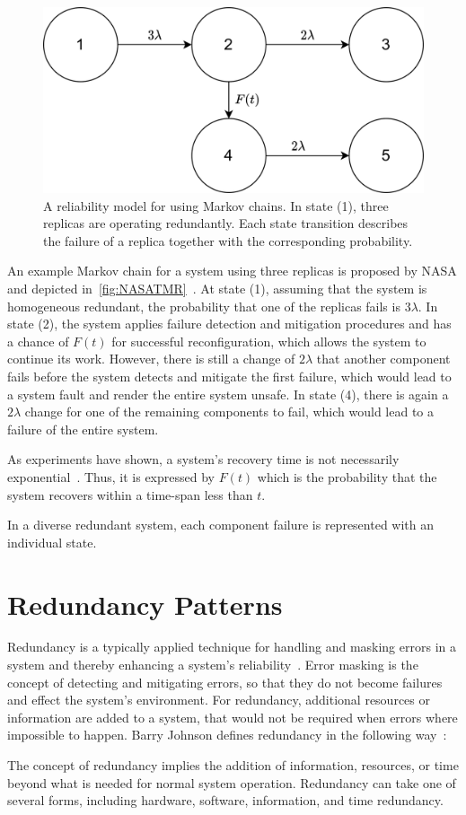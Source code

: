 \begin{figure}[!hb]
	\centering
	\includegraphics[width=0.75\linewidth]{images/TriplexSystemNASA}
	\caption{A reliability model for  using Markov chains. In state (1), three replicas are operating redundantly. Each state transition describes the failure of a replica together with the corresponding probability.}
	\label{fig:NASATMR}
\end{figure}

An example Markov chain for a system using three replicas is proposed by NASA and depicted in~\autoref{fig:NASATMR}~\cite{NASAMarkovChains}.
At state (1), assuming that the system is homogeneous redundant, the probability that one of the replicas fails is $3\lambda$.
In state (2), the system applies failure detection and mitigation procedures and has a chance of $F(t)$ for successful reconfiguration, which allows the system to continue its work.
However, there is still a change of $2\lambda$ that another component fails before the system detects and mitigate the first failure, which would lead to a system fault and render the entire system unsafe.
In state (4), there is again a $2\lambda$ change for one of the remaining components to fail, which would lead to a failure of the entire system.

As experiments have shown, a system's recovery time is not necessarily exponential~\cite{TheoryAndPracticeReliableSystem}.
Thus, it is expressed by $F(t)$ which is the probability that the system recovers within a time-span less than $t$.

In a diverse redundant system, each component failure is represented with an individual state.

\section{Redundancy Patterns}
\label{sec:redundancyPatterns}
Redundancy is a typically applied technique for handling and masking errors in a system and thereby enhancing a system's reliability~\cite{TanenbaumSteen07}.
Error masking is the concept of detecting and mitigating errors, so that they do not become failures and effect the system's environment.
For redundancy, additional resources or information are added to a system, that would not be required when errors where impossible to happen.
Barry Johnson defines redundancy in the following way~\cite{BarryFaultToleranceAnalysis}:
\begin{definition}
The concept of redundancy implies the addition of information, resources, or time beyond what is needed for normal system operation.
Redundancy can take one of several forms, including hardware, software, information, and time redundancy.
\end{definition}

